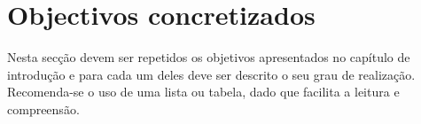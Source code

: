\section{Objectivos concretizados} %
\label{sec:objectivos_concretizados}

Nesta secção devem ser repetidos os objetivos apresentados no capítulo de introdução e para cada um deles deve ser descrito o seu grau de realização. Recomenda-se o uso de uma lista ou tabela, dado que facilita a leitura e compreensão.

